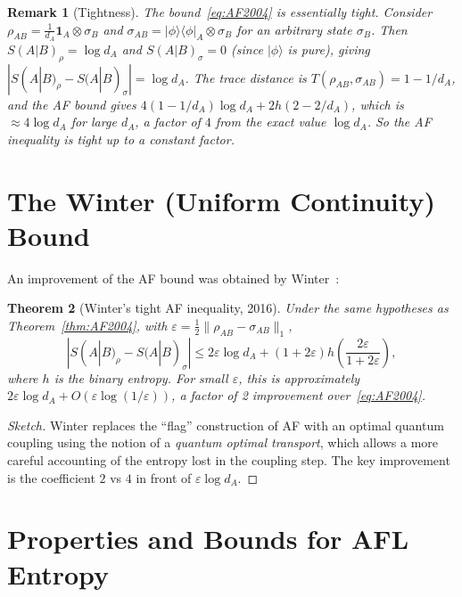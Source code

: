 \documentclass[12pt,a4paper]{article}
\newtheorem{theorem}{Theorem}[section]
\newtheorem{remark}[theorem]{Remark}
\begin{document}
\begin{remark}[Tightness]
The bound~\eqref{eq:AF2004} is essentially tight.  Consider
$\rho_{AB}=\frac{1}{d_A}\mathbf{1}_A\otimes\sigma_B$ and
$\sigma_{AB}=|\phi\rangle\langle\phi|_A\otimes\sigma_B$ for an arbitrary state
$\sigma_B$.  Then $S(A|B)_\rho=\log d_A$ and $S(A|B)_\sigma=0$
(since $|\phi\rangle$ is pure), giving $|S(A|B)_\rho-S(A|B)_\sigma|=\log d_A$.
The trace distance is $T(\rho_{AB},\sigma_{AB})=1-1/d_A$, and the AF bound
gives $4(1-1/d_A)\log d_A+2h(2-2/d_A)$, which is $\approx 4\log d_A$ for
large $d_A$, a factor of $4$ from the exact value $\log d_A$.  So the AF
inequality is tight up to a constant factor.
\end{remark}

\section{The Winter (Uniform Continuity) Bound}

An improvement of the AF bound was obtained by Winter~\cite{winter2016}:

\begin{theorem}[Winter's tight AF inequality, 2016]\label{thm:winter}
Under the same hypotheses as Theorem~\ref{thm:AF2004}, with
$\varepsilon=\frac{1}{2}\|\rho_{AB}-\sigma_{AB}\|_1$,
\begin{equation}\label{eq:winter}
  |S(A|B)_\rho - S(A|B)_\sigma|
  \leq 2\varepsilon\log d_A + (1+2\varepsilon)h\!\left(\frac{2\varepsilon}{1+2\varepsilon}\right),
\end{equation}
where $h$ is the binary entropy.  For small $\varepsilon$, this is approximately
$2\varepsilon\log d_A + O(\varepsilon\log(1/\varepsilon))$, a factor of 2
improvement over~\eqref{eq:AF2004}.
\end{theorem}

\begin{proof}[Sketch]
Winter replaces the ``flag'' construction of AF with an optimal quantum
coupling using the notion of a \emph{quantum optimal transport}, which allows
a more careful accounting of the entropy lost in the coupling step.  The
key improvement is the coefficient $2$ vs $4$ in front of $\varepsilon\log d_A$.
\end{proof}

\section{Properties and Bounds for AFL Entropy}
\end{document}
